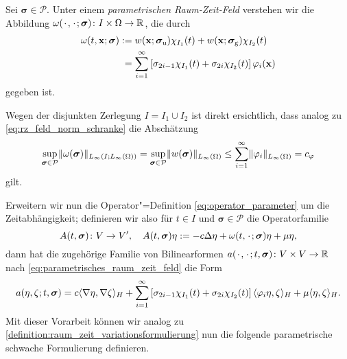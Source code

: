 \documentclass[../main.tex]{subfiles}
\begin{document}
\begin{Definition}
\label{definition:parametrisches_raum_zeit_feld}
    Sei $\bm\sigma \in \mathcal P$.
    Unter einem \emph{parametrischen Raum-Zeit-Feld} verstehen wir die Abbildung
    $\omega({\mkern2mu\cdot\mkern2mu}, {\mkern2mu\cdot\mkern2mu}; \bm\sigma) \colon I \times \Omega \to \mathbb{R}$, die durch
    \begin{equation}
    \label{eq:parametrisches_raum_zeit_feld}
        \begin{aligned}
            \omega(t, \mathbf{x}; \bm\sigma)
            &:= w(\mathbf{x}; \bm\sigma_{\text{u}}) \chi_{I_{1}}(t) + w(\mathbf{x}; \bm\sigma_{\text{g}}) \chi_{I_{2}}(t)\\
            &\phantom{:}= \sum_{i = 1}^{\infty} \left[\sigma_{2i-1} \chi_{I_{1}}(t) + \sigma_{2i} \chi_{I_{2}}(t)\right] \varphi_{i}(\mathbf{x})
        \end{aligned}
    \end{equation}
    gegeben ist.
\end{Definition}

Wegen der disjunkten Zerlegung $I = I_{1} \cup I_{2}$ ist direkt ersichtlich, dass analog zu \cref{eq:rz_feld_norm_schranke} die Abschätzung
\begin{equation}
\label{eq:parametrisches_raum_zeit_feld_schranke}
    \sup_{\bm\sigma \in \mathcal P} \lVert\omega(\bm\sigma)\rVert_{L_{\infty}(I; L_{\infty}(\Omega))}
    = \sup_{\bm\sigma \in \mathcal P} \lVert w(\bm\sigma)\rVert_{L_{\infty}(\Omega)} \leq \sum_{i = 1}^{\infty} \lVert\varphi_{i}\rVert_{L_{\infty}(\Omega)} = c_{\varphi}
\end{equation}
gilt.

Erweitern wir nun die Operator"=Definition \cref{eq:operator_parameter} um die Zeitabhängigkeit; definieren wir also für $t \in I$ und $\bm\sigma \in \mathcal P$ die Operatorfamilie
\begin{equation}
    \label{eq:operator_zeit_parameter}
    A(t, \bm\sigma) \colon V \to V', \quad A(t, \bm\sigma) \eta := -c \Delta \eta + \omega(t, {\mkern2mu\cdot\mkern2mu}; \bm\sigma) \eta + \mu \eta,
\end{equation}
dann hat die zugehörige Familie von Bilinearformen $a({\mkern2mu\cdot\mkern2mu}, {\mkern2mu\cdot\mkern2mu}; t, \bm\sigma) \colon V \times V \to \mathbb{R}$ nach \cref{eq:parametrisches_raum_zeit_feld} die Form
\begin{equation}
    \label{eq:bilinearform_zeit_parameter}
    \begin{aligned}
        a(\eta, \zeta; t, \bm\sigma) = c\langle\nabla \eta,\nabla \zeta\rangle_{H} + \sum_{i = 1}^{\infty} \left[ \sigma_{2i-1} \chi_{I_{1}}(t) + \sigma_{2i} \chi_{I_{2}}(t)  \right] \langle\varphi_{i} \eta,\zeta\rangle_{H} + \mu \langle\eta,\zeta\rangle_{H}.
    \end{aligned}
\end{equation}
Mit dieser Vorarbeit können wir analog zu \cref{definition:raum_zeit_variationsformulierung} nun die folgende parametrische schwache Formulierung definieren.
\end{document}
